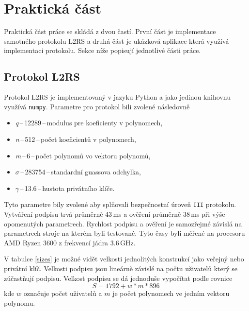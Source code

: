 
\newcommand{\param}[2]{\textit{#1}\,--\,#2\,--\,}
\newcommand{\paramnott}[2]{#1\,--\,#2\,--\,}

\chapter{Praktická část}
Praktická část práce se skládá z dvou častí. První část je implementace samotného protokolu L2RS a druhá část je ukázková aplikace která využívá implementaci protokolu. Sekce níže popisují jednotlivé části práce.


\section{Protokol L2RS}
Protokol L2RS je implementovaný v jazyku Python a jako jedinou knihovnu využívá \texttt{numpy}. Parametre pro protokol bili zvolené následovně
\begin{itemize}
  \item \param{q}{12289}modulus pre koeficienty v polynomech,
  \item \param{n}{512}počet koeficientů v polynomech,
  \item \param{m}{6}počet polynomů vo vektoru polynomů,
  \item \paramnott{$\sigma$}{283754}standardní guassova odchylka,
  \item \paramnott{$\gamma$}{13.6}hustota privátního klíče.
\end{itemize}
Tyto parametre bily zvolené aby splňovali bezpečnostní úroveň \texttt{III} protokolu. Vytváření podpisu trvá průměrně 43\,ms a ověření průměrně 38\,ms při výše opomenutých parametrech. Rychlost podpisu a ověření je samozřejmé závislá na parametrech stroje na kterém byli testované. Tyto časy byli měřené na procesoru AMD Ryzen 3600 z frekvencí jádra 3.6\,GHz.

V tabulce \ref{sizes} je možné vidět velkosti jednolitých konstrukcí jako veřejný nebo privátní klíč. Velkosti podpisu jsou lineárně závislé na počtu uživatelů který se zúčastňují podpisu. Velkost podpisu se dá jednoduše vypočítat podle rovnice
\begin{equation}
  S=1792+w*m*896
\end{equation}
kde $w$ označuje počet uživatelů a $m$ je počet polynomech ve jedním vektoru polynomu.

